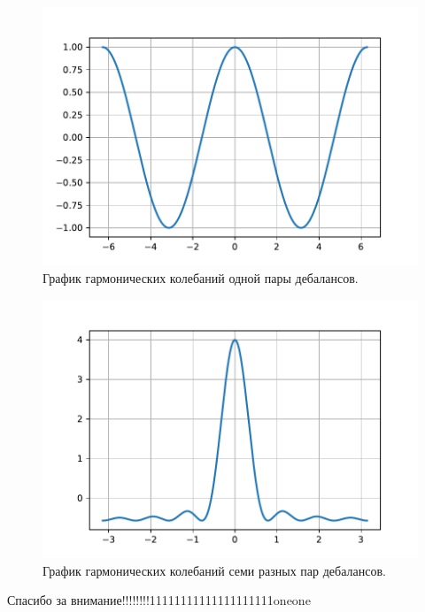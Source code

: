 \documentclass[10pt, pdf, hyperref={unicode}]{beamer}
\begin{document}
    \begin{frame}
        \begin{minipage}[h]{0.48\linewidth}
            \begin{figure}[h]
                \includegraphics[width=1\linewidth]{../grap/impulse_1.pdf}
                \caption{График гармонических колебаний одной пары дебалансов.}
            \end{figure}
        \end{minipage}
        \hfill 
        \begin{minipage}[h]{0.48\linewidth}
            \begin{figure}[h]
                \includegraphics[width=1\linewidth]{../grap/impulse_7.pdf}
                \caption{График гармонических колебаний семи разных пар дебалансов.}
            \end{figure}
        \end{minipage}
    \end{frame}


    \begin{frame}
        \centerline{\large Спасибо за внимание!!!!!!!!11111111111111111111oneone}
    \end{frame}
\end{document}
